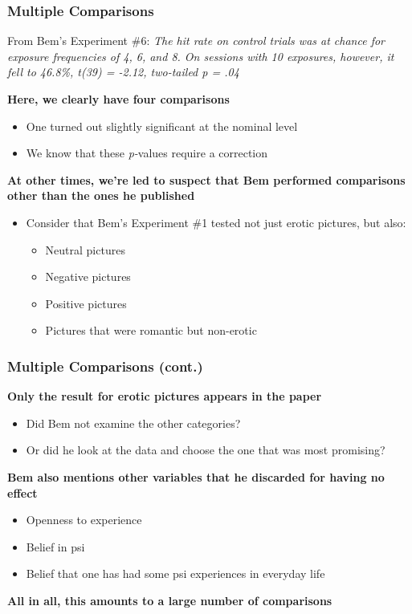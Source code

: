\documentclass[10pt, block=fill]{beamer}
\begin{document}
\begin{frame}
    \frametitle{Multiple Comparisons}
    
    \begin{block}{From Bem's Experiment \#6:}
        \textit{The hit rate on control trials was at chance for exposure frequencies of 4, 6, and 8. On sessions with 10 exposures, however, it fell to 46.8\%, t(39) = -2.12, two-tailed \textit{p} = .04}
    \end{block}

    \textbf{Here, we clearly have four comparisons}
    \begin{itemize}
        \item One turned out slightly significant at the nominal level
        \item We know that these \textit{p-}values require a correction
    \end{itemize}
    
    \textbf{At other times, we're led to suspect that Bem performed comparisons other than the ones he published}
    \begin{itemize}
        \item Consider that Bem's Experiment \#1 tested not just erotic pictures, but also:
        \begin{itemize}
            \item Neutral pictures
            \item Negative pictures 
            \item Positive pictures
            \item Pictures that were romantic but non-erotic
        \end{itemize}
    \end{itemize}
\end{frame}

\begin{frame}
    \frametitle{Multiple Comparisons (cont.)}
    
    \textbf{Only the result for erotic pictures appears in the paper}
    \begin{itemize}
        \item Did Bem not examine the other categories?
        \item Or did he look at the data and choose the one that was most promising?
    \end{itemize}
    
    \textbf{Bem also mentions other variables that he discarded for having no effect}
    \begin{itemize}
        \item Openness to experience
        \item Belief in psi
        \item Belief that one has had some psi experiences in everyday life
    \end{itemize}
    
    \vspace{0.2in}
    
    \textbf{ \large{All in all, this amounts to a large number of comparisons}}
\end{frame}
\end{document}

